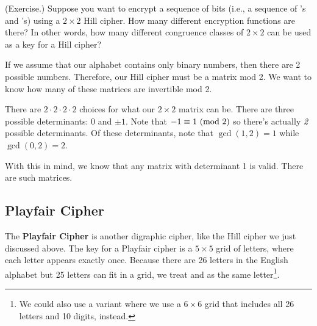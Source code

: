 \documentclass[letterpaper]{article}
\begin{document}
\begin{mdframed}
    (Exercise.) Suppose you want to encrypt a sequence of bits (i.e., a sequence of 's and 's) using a $2 \times 2$ Hill cipher. How many different encryption functions are there? In other words, how many different congruence classes of $2 \times 2$ can be used as a key for a Hill cipher? 

    \begin{mdframed}
        If we assume that our alphabet contains only binary numbers, then there are 2 possible numbers. Therefore, our Hill cipher must be a matrix mod 2. We want to know how many of these matrices are invertible mod 2. 

        \bigskip 

        There are $2 \cdot 2 \cdot 2 \cdot 2$ choices for what our $2 \times 2$ matrix can be. There are three possible determinants: $0$ and $\pm 1$. Note that $-1 \equiv 1 \ (\mathrm{mod}\ 2)$ so there's actually \emph{2} possible determinants. Of these determinants, note that $\gcd(1, 2) = 1$ while $\gcd(0, 2) = 2$.
        
        \bigskip 

        With this in mind, we know that any matrix with determinant 1 is valid. There are  such matrices.
    \end{mdframed}
\end{mdframed}

\subsection{Playfair Cipher}
The \textbf{Playfair Cipher} is another digraphic cipher, like the Hill cipher we just discussed above. The key for a Playfair cipher is a $5 \times 5$ grid of letters, where each letter appears exactly once. Because there are 26 letters in the English alphabet but 25 letters can fit in a grid, we treat  and  as the same letter\footnote{We could also use a variant where we use a $6 \times 6$ grid that includes all 26 letters and 10 digits, instead.}. 

\bigskip 
\end{document}
